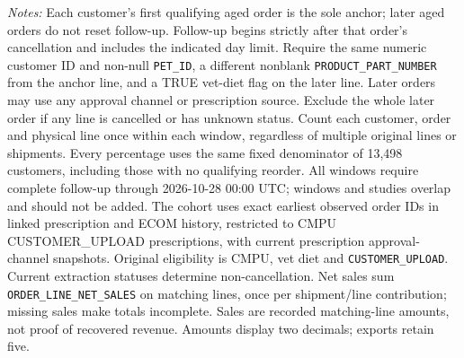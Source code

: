 \begin{table}[!htbp]
\begin{minipage}{\linewidth}
\footnotesize
\textit{Notes:} Each customer's first qualifying aged order is the sole anchor;
later aged orders do not reset follow-up. Follow-up begins strictly after that
order's cancellation and includes the indicated day limit. Require the same numeric customer ID and non-null \texttt{PET\_ID}, a different nonblank \texttt{PRODUCT\_PART\_NUMBER} from the anchor line, and a TRUE vet-diet flag on the later line. Later orders may use any approval channel or prescription
source. Exclude the whole later order if any line is cancelled or has unknown
status. Count each customer, order and physical line once within each window,
regardless of multiple original lines or shipments. Every percentage uses the
same fixed denominator of 13,498 customers, including those with no
qualifying reorder. All windows require complete follow-up through
2026-10-28 00:00 UTC; windows and studies overlap and should not be added.
The cohort uses exact earliest observed order IDs in linked prescription and
ECOM history, restricted to CMPU CUSTOMER\_UPLOAD prescriptions, with current
prescription approval-channel snapshots. Original eligibility is CMPU,
vet diet and \texttt{CUSTOMER\_UPLOAD}. Current extraction statuses determine
non-cancellation. Net sales sum \texttt{ORDER\_LINE\_NET\_SALES} on matching
lines, once per shipment/line contribution; missing sales make totals incomplete.
Sales are recorded matching-line amounts, not proof of recovered revenue.
Amounts display two decimals; exports retain five.
\end{minipage}
\end{table}
